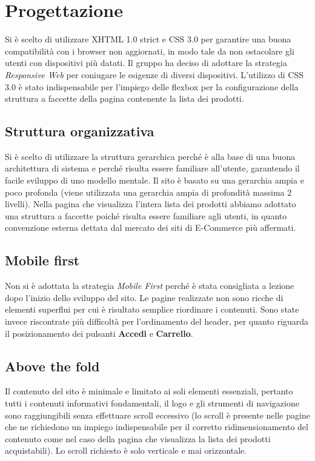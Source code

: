 \section{Progettazione}
Si è scelto di utilizzare XHTML 1.0 strict e CSS 3.0 per garantire una buona compatibilità con i browser non aggiornati, in modo tale da non ostacolare gli utenti con dispositivi più datati.
Il gruppo ha deciso di adottare la strategia \textit{Responsive Web} per coniugare le esigenze di diversi dispositivi. L'utilizzo di CSS 3.0 è stato indispensabile per l'impiego delle flexbox per la configurazione della struttura a faccette della pagina contenente la lista dei prodotti.

\subsection{Struttura organizzativa} 
Si è scelto di utilizzare la struttura gerarchica perché è alla base di una buona architettura di sistema e perché risulta essere familiare all'utente, garantendo il facile sviluppo di uno modello mentale. Il sito è basato su una gerarchia ampia e poco profonda (viene utilizzata una gerarchia ampia di profondità massima 2 livelli).
Nella pagina che visualizza l'intera lista dei prodotti abbiamo adottato una struttura a faccette poiché risulta essere familiare agli utenti, in quanto convenzione esterna dettata dal mercato dei siti di E-Commerce più affermati.

\subsection{Mobile first}
Non si è adottata la strategia \textit{Mobile First} perché è stata consigliata a lezione dopo l'inizio dello sviluppo del sito. Le pagine realizzate non sono ricche di elementi superflui per cui è risultato semplice riordinare i contenuti. Sono state invece riscontrate più difficoltà per l'ordinamento del header, per quanto riguarda il posizionamento dei pulsanti \textbf{Accedi} e \textbf{Carrello}.

\subsection{Above the fold}
Il contenuto del sito è minimale e limitato ai soli elementi essenziali, pertanto tutti i contenuti informativi fondamentali, il logo e gli strumenti di navigazione sono raggiungibili senza effettuare scroll eccessivo (lo scroll è presente nelle pagine che ne richiedono un impiego indispensabile per il corretto ridimensionamento del contenuto come nel caso della pagina che visualizza la lista dei prodotti acquistabili). Lo scroll richiesto è solo verticale e mai orizzontale.


